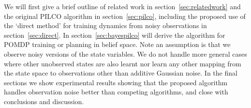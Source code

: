 \documentclass{article}
\begin{document}
We will first give a brief outline of related work in section~\ref{sec:relatedwork} and
the original PILCO algorithm in section~\ref{sec:pilco},
including the proposed use of the `direct method' for training dynamics
from noisy observations in section~\ref{sec:direct}.
In section~\ref{sec:bayespilco} will derive the algorithm for POMDP training or planning in belief space.
Note an assumption is that we observe noisy versions of the state variables.
We do not handle more general cases where other unobserved states are also learnt nor
learn any other mapping from the state space to observations other than additive Gaussian noise.
In the final sections we show experimental
results showing that the proposed algorithm handles observation noise better than competing algorithms,
and close with conclusions and discussion.

\end{document}
